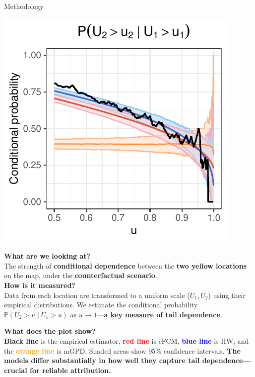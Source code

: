 \documentclass[final]{beamer}
\newlength{\colwidth}
\begin{document}
\begin{frame}[t]
\begin{columns}[t]
\begin{column}{\colwidth}
\begin{block}{Methodology}
\noindent
\begin{minipage}[t]{0.4\linewidth}
  \vspace{-.5cm}
  \includegraphics[width=\linewidth]{Figures/chi_poster.pdf}
\end{minipage}%
\hfill
\begin{minipage}[t]{0.55\linewidth}
  \vspace{0pt}
  \normalsize
  \textbf{What are we looking at?}  
  \\
  The strength of \textbf{conditional dependence} between the \textbf{two yellow locations} on the map, under the \textbf{counterfactual scenario}.
  \\[1ex]
  \textbf{How is it measured?}  
  \\
  Data from each location are transformed to a {uniform scale} (\(U_1, U_2\)) using their empirical distributions. We estimate the conditional probability \( \mathbb{P}(U_2 > u \mid U_1 > u) \) as \(u \to 1\)—\textbf{a key measure of tail dependence}.
  \\[1ex]
\end{minipage}

 \textbf{What does the plot show?}  \\
  \textbf{Black line} is the empirical estimator, \textbf{\textcolor{red}{red line}} is eFCM, \textbf{\textcolor{blue}{blue line}} is HW, and the \textbf{\textcolor{orange}{orange line}} is mGPD. Shaded areas show 95\% confidence intervals. \textbf{The models differ substantially in how well they capture tail dependence—crucial for reliable attribution.}


\end{block}
\end{column}
\end{columns}
\end{frame}
\end{document}
